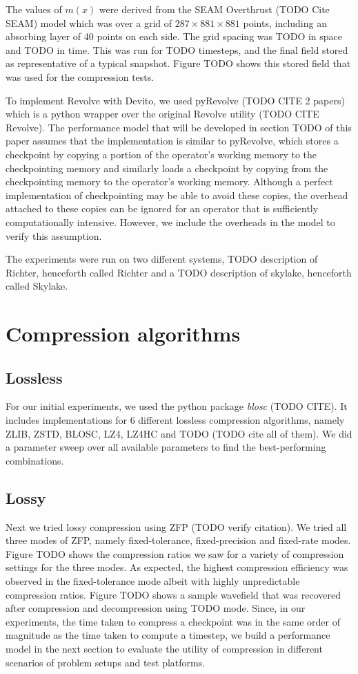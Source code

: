 \documentclass[conference]{IEEEtran}
\begin{document}
The values of $m(x)$ were derived from the SEAM Overthrust (TODO Cite SEAM) model which was over a grid
of $287 \times 881 \times 881$ points, including an absorbing layer of 40 points on each side. The grid spacing
was TODO in space and TODO in time. This was run for TODO timesteps, and the final field stored as
representative of a typical snapshot. Figure TODO shows this stored field that was used for the compression tests. 


To implement Revolve with Devito, we used pyRevolve (TODO CITE 2 papers) which is a python wrapper over the
original Revolve utility (TODO CITE Revolve). The performance model that will be developed in section TODO of
this paper assumes that the implementation is similar to pyRevolve, which stores a checkpoint by copying a portion
of the operator's working memory to the checkpointing memory and similarly loads a checkpoint by copying from the
checkpointing memory to the operator's working memory. Although a perfect implementation of checkpointing may
be able to avoid these copies, the overhead attached to these copies can be ignored for an operator that is
sufficiently computationally intensive. However, we include the overheads in the model to verify this assumption. 

The experiments were run on two different systems, TODO description of Richter, henceforth called Richter and a
TODO description of skylake, henceforth called Skylake.


\section{Compression algorithms}
\subsection{Lossless}
For our initial experiments, we used the python package \emph{blosc} (TODO CITE). It includes implementations for
6 different lossless compression algorithms, namely ZLIB, ZSTD, BLOSC, LZ4, LZ4HC and TODO (TODO cite all of them).
We did a parameter sweep over all available parameters to find the best-performing combinations. 
\subsection{Lossy}
Next we tried lossy compression using ZFP \cite{ratanaworabhan2006fast} (TODO verify citation).
We tried all three modes of ZFP, namely fixed-tolerance, fixed-precision and fixed-rate modes. Figure TODO shows the compression ratios
we saw for a variety of compression settings for the three modes. As expected, the highest compression efficiency was
observed in the fixed-tolerance mode albeit with highly unpredictable compression ratios. Figure TODO shows a sample
wavefield that was recovered after compression and decompression using TODO mode. Since, in our experiments, the time
taken to compress a checkpoint was in the same order of magnitude as the time taken to compute a timestep, we build a
performance model in the next section to evaluate the utility of compression in different scenarios of problem setups and test
platforms.
\end{document}
